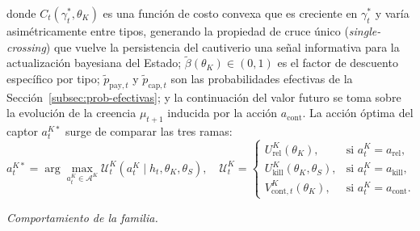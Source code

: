 \documentclass[review,authoryear,12pt]{elsarticle}
\theoremstyle{plain}
\theoremstyle{definition}
\newcommand{\1}{\mathbf{1}}
\begin{document}
donde $C_t(\gamma_t^\ast,\theta_K)$ es una función de costo convexa que es creciente en $\gamma_t^\ast$ y varía asimétricamente entre tipos, generando la propiedad de cruce único (\textit{single-crossing}) que vuelve la persistencia del cautiverio una señal informativa para la actualización bayesiana del Estado; $\tilde{\beta}(\theta_K)\in(0,1)$ es el factor de descuento específico por tipo; $\tilde{p}_{\mathrm{pay},t}$ y $\tilde{p}_{\mathrm{cap},t}$ son las probabilidades efectivas de la Sección~\ref{subsec:prob-efectivas}; y la continuación del valor futuro se toma sobre la evolución de la creencia $\mu_{t+1}$ inducida por la acción $a_{\mathrm{cont}}$. La acción óptima del captor $a_t^{K\ast}$ surge de comparar las tres ramas:
\begin{equation}
a_t^{K\ast}=\arg\max_{a_t^K\in\mathcal{A}^K}\mathcal{U}^K_t(a_t^K\mid h_t,\theta_K,\theta_S),\quad
\mathcal{U}^K_t=\begin{cases}U^K_{\mathrm{rel}}(\theta_K), & \text{si }a_t^K=a_{\mathrm{rel}},\\U^K_{\mathrm{kill}}(\theta_K,\theta_S), & \text{si }a_t^K=a_{\mathrm{kill}},\\V^K_{\mathrm{cont},t}(\theta_K), & \text{si }a_t^K=a_{\mathrm{cont}}.\end{cases}
\label{eq:k-argmax}
\end{equation}

\noindent\textit{Comportamiento de la familia.}
\end{document}
